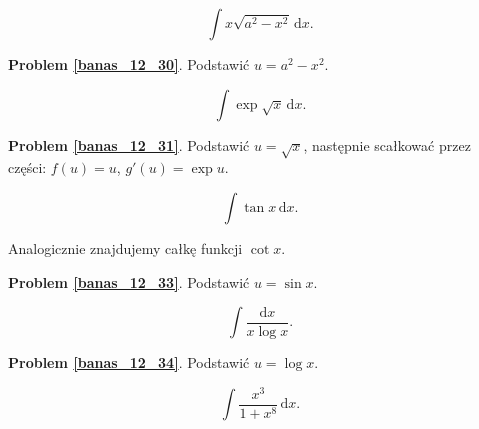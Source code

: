 \begin{problem_with_solution}
    \label{banas_12_30}%
    \begin{equation}
        \int x \sqrt{a^2 - x^2} \, \mathrm{d}x.
    \end{equation}
\end{problem_with_solution}

\textbf{Problem \ref{banas_12_30}}.
Podstawić $u = a^2 - x^2$.

\begin{problem_with_solution}
    \label{banas_12_31}%
    \begin{equation}
        \int \exp \sqrt x \, \mathrm{d}x.
    \end{equation}
\end{problem_with_solution}

\textbf{Problem \ref{banas_12_31}}.
Podstawić $u = \sqrt x$, następnie scałkować przez części: $f(u) = u$, $g'(u) = \exp u$.

\begin{problem_with_solution}
    \label{banas_12_33}%
    \begin{equation}
        \int \tan x \, \mathrm{d}x.
    \end{equation}
\end{problem_with_solution}

Analogicznie znajdujemy całkę funkcji $\cot x$.

\textbf{Problem \ref{banas_12_33}}.
Podstawić $u = \sin x$.

\begin{problem_with_solution}
    \label{banas_12_34}%
    \begin{equation}
        \int \frac{\mathrm{d}x}{x \log x}.
    \end{equation}
\end{problem_with_solution}

\textbf{Problem \ref{banas_12_34}}.
Podstawić $u = \log x$.

\begin{problem_with_solution}
    \label{banas_12_40}%
    \begin{equation}
        \int \frac{x^3}{1+x^8} \, \mathrm{d}x.
    \end{equation}
\end{problem_with_solution}

